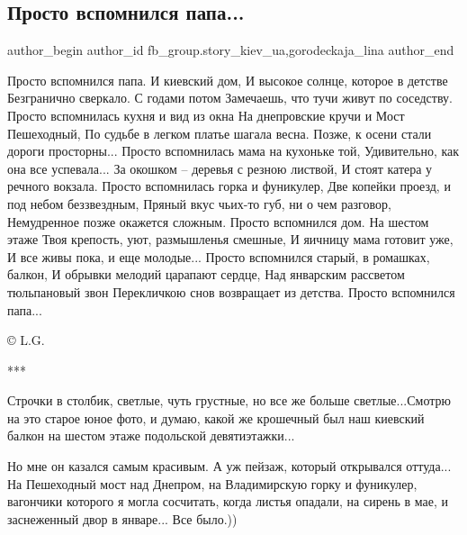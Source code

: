  
 
 
 
 
 
\subsection{Просто вспомнился папа...}
\label{sec:15_01_2022.fb.fb_group.story_kiev_ua.1.papa}
 
\ifcmt
 author_begin
   author_id fb_group.story_kiev_ua,gorodeckaja_lina
 author_end
\fi

\obeycr
Просто вспомнился папа. И киевский дом,
И высокое солнце, которое в детстве
Безгранично сверкало. С годами потом
Замечаешь, что тучи живут по соседству.
Просто вспомнилась кухня и вид из окна
На днепровские кручи и Мост Пешеходный,
По судьбе в легком платье шагала весна.
Позже, к осени стали дороги просторны...
Просто вспомнилась мама на кухоньке той,
Удивительно, как она все успевала...
За окошком – деревья с резною листвой,
И стоят катера у речного вокзала.
Просто вспомнилась горка и фуникулер,
Две копейки проезд, и под небом беззвездным,
Пряный вкус чьих-то губ, ни о чем разговор,
Немудренное позже окажется сложным.
Просто вспомнился дом. На шестом этаже
Твоя крепость, уют, размышленья смешные,
И яичницу мама готовит уже,
И все живы пока, и еще молодые...
Просто вспомнился старый, в ромашках, балкон,
И обрывки мелодий царапают сердце,
Над январским рассветом тюльпановый звон
Перекличкою снов возвращает из детства.
Просто вспомнился папа...
\restorecr

© L.G.

***

Строчки в столбик, светлые, чуть грустные, но все же больше светлые...Смотрю на
это старое юное фото, и думаю, какой же крошечный был наш киевский балкон на
шестом этаже подольской девятиэтажки...  

Но мне он казался самым красивым. А уж пейзаж, который открывался оттуда... На
Пешеходный мост над Днепром, на Владимирскую горку и фуникулер, вагончики
которого я могла сосчитать, когда листья опадали, на сирень в мае, и
заснеженный двор в январе... Все было.))

